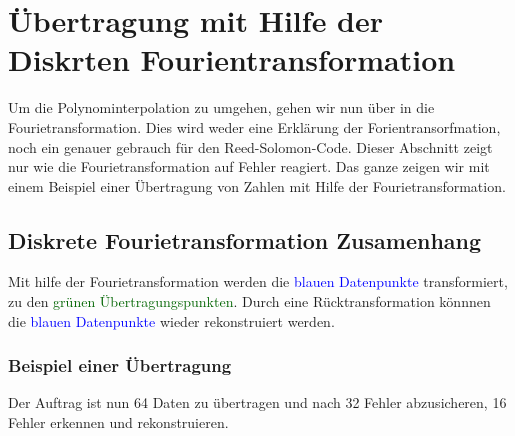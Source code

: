 %
%
\section{Übertragung mit Hilfe der Diskrten Fourientransformation
\label{reedsolomon:section:dtf}}
Um die Polynominterpolation zu umgehen, gehen wir nun über in die Fourietransformation.
Dies wird weder eine Erklärung der Forientransorfmation, noch ein genauer gebrauch für den Reed-Solomon-Code. 
Dieser Abschnitt zeigt nur wie die Fourietransformation auf Fehler reagiert.
Das ganze zeigen wir mit einem Beispiel einer Übertragung von Zahlen mit Hilfe der Fourietransformation.

\subsection{Diskrete Fourietransformation Zusamenhang
\label{reedsolomon:subsection:dtfzusamenhang}}
Mit hilfe der Fourietransformation werden die \textcolor{blue}{blauen Datenpunkte} transformiert,
zu den \textcolor{darkgreen}{grünen Übertragungspunkten}. 
Durch eine Rücktransformation könnnen die \textcolor{blue}{blauen Datenpunkte} wieder rekonstruiert werden.

\subsubsection{Beispiel einer Übertragung
\label{reedsolomon:subsection:Übertragungsabfolge}}
Der Auftrag ist nun 64 Daten zu übertragen und nach 32 Fehler abzusicheren,
16 Fehler erkennen und rekonstruieren.

